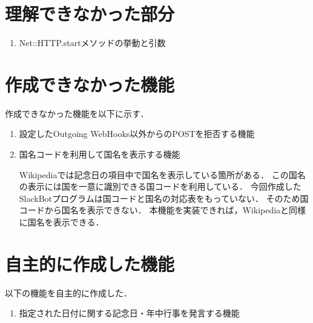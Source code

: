 \documentclass[fleqn, 14pt]{extarticlej}
\begin{document}
\section{理解できなかった部分}
\begin{enumerate}
\item Net::HTTP.startメソッドの挙動と引数
\end{enumerate}

\section{作成できなかった機能}
作成できなかった機能を以下に示す．
\begin{enumerate}
\item 設定したOutgoing WebHooks以外からのPOSTを拒否する機能
\item 国名コードを利用して国名を表示する機能
  
  Wikipediaでは記念日の項目中で国名を表示している箇所がある．
  この国名の表示には国を一意に識別できる国コードを利用している．
  今回作成したSlackBotプログラムは国コードと国名の対応表をもっていない．
  そのため国コードから国名を表示できない．
  本機能を実装できれば，Wikipediaと同様に国名を表示できる．
  
  
\end{enumerate}

\section{自主的に作成した機能}
以下の機能を自主的に作成した．
\begin{enumerate}
\item 指定された日付に関する記念日・年中行事を発言する機能
\end{enumerate}







 
\end{document}
